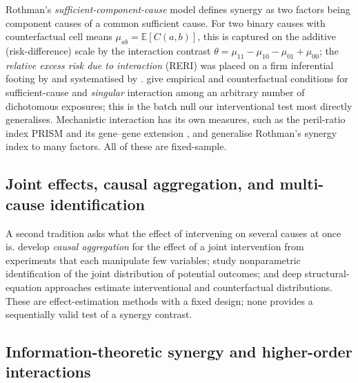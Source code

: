 \documentclass[pdflatex,sn-mathphys-ay]{sn-jnl}%
\theoremstyle{thmstyleone}%
\theoremstyle{thmstyletwo}%
\theoremstyle{thmstylethree}%
\newcommand{\E}{\mathbb{E}}
\begin{document}
Rothman's \emph{sufficient-component-cause} model \citep{rothman1976} defines synergy as
two factors being component causes of a common sufficient cause. For two binary causes
with counterfactual cell means $\mu_{ab}=\E[C(a,b)]$, this is captured on the
additive (risk-difference) scale by the interaction contrast
$\theta=\mu_{11}-\mu_{10}-\mu_{01}+\mu_{00}$; the \emph{relative excess risk due to
interaction} (RERI) was placed on a firm inferential footing by \citet{hosmer1992} and
systematised by \citet{vanderweele2014}. \citet{vanderweele2012} give empirical and
counterfactual conditions for sufficient-cause and \emph{singular} interaction among an
arbitrary number of dichotomous exposures; this is the batch null our interventional test
most directly generalises. Mechanistic interaction has its own measures, such as the
peril-ratio index PRISM \citep{lee2013} and its gene--gene extension \citep{lin2018}, and
\citet{latorre2026} generalise Rothman's synergy index to many factors. All of these are
fixed-sample.

\subsection{Joint effects, causal aggregation, and multi-cause identification}\label{subsec:joint}

A second tradition asks what the effect of intervening on several causes at once is.
\citet{roquero2023} develop \emph{causal aggregation} for the effect of a joint
intervention from experiments that each manipulate few variables; \citet{wu2025} study
nonparametric identification of the joint distribution of potential outcomes; and deep
structural-equation approaches \citep{balgi2024} estimate interventional and
counterfactual distributions. These are effect-estimation methods with a fixed design;
none provides a sequentially valid test of a synergy contrast.

\subsection{Information-theoretic synergy and higher-order interactions}\label{subsec:info}
\end{document}
